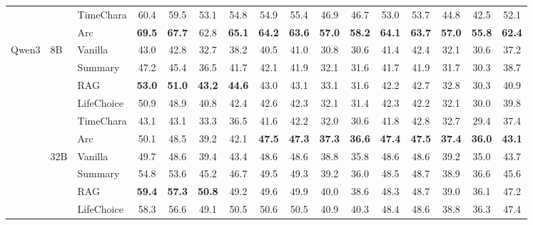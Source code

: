\documentclass[11pt]{article}
\begin{document}
\begin{table}[!htbp]
\begin{tabular}{lllccccccccccccc}
 &  & TimeChara & 60.4 & 59.5 & 53.1 & 54.8 & 54.9 & 55.4 & 46.9 & 46.7 & 53.0 & 53.7 & 44.8 & 42.5 & 52.1 \\
 &  & \cellcolor{yellow!15} Arc & \cellcolor{yellow!15} \textbf{69.5} & \cellcolor{yellow!15} \textbf{67.7} & \cellcolor{yellow!15} 62.8 & \cellcolor{yellow!15} \textbf{65.1} & \cellcolor{yellow!15} \textbf{64.2} & \cellcolor{yellow!15} \textbf{63.6} & \cellcolor{yellow!15} \textbf{57.0} & \cellcolor{yellow!15} \textbf{58.2} & \cellcolor{yellow!15} \textbf{64.1} & \cellcolor{yellow!15} \textbf{63.7} & \cellcolor{yellow!15} \textbf{57.0} & \cellcolor{yellow!15} \textbf{55.8} & \cellcolor{yellow!15} \textbf{62.4} \\
\midrule
\multirow[t]{12}{*}{Qwen3} & \multirow[t]{6}{*}{8B} & Vanilla & 43.0 & 42.8 & 32.7 & 38.2 & 40.5 & 41.0 & 30.8 & 30.6 & 41.4 & 42.4 & 32.1 & 30.6 & 37.2 \\
 &  & Summary & 47.2 & 45.4 & 36.5 & 41.7 & 42.1 & 41.9 & 32.1 & 31.6 & 41.7 & 41.9 & 31.7 & 30.3 & 38.7 \\
 &  & RAG & \textbf{53.0} & \textbf{51.0} & \textbf{43.2} & \textbf{44.6} & 43.0 & 43.1 & 33.1 & 31.6 & 42.2 & 42.7 & 32.8 & 30.3 & 40.9 \\
 &  & LifeChoice & 50.9 & 48.9 & 40.8 & 42.4 & 42.6 & 42.3 & 32.1 & 31.4 & 42.3 & 42.2 & 32.1 & 30.0 & 39.8 \\
 &  & TimeChara & 43.1 & 43.1 & 33.3 & 36.5 & 41.6 & 42.2 & 32.0 & 30.6 & 41.8 & 42.8 & 32.7 & 29.4 & 37.4 \\
 &  & \cellcolor{yellow!15} Arc & \cellcolor{yellow!15} 50.1 & \cellcolor{yellow!15} 48.5 & \cellcolor{yellow!15} 39.2 & \cellcolor{yellow!15} 42.1 & \cellcolor{yellow!15} \textbf{47.5} & \cellcolor{yellow!15} \textbf{47.3} & \cellcolor{yellow!15} \textbf{37.3} & \cellcolor{yellow!15} \textbf{36.6} & \cellcolor{yellow!15} \textbf{47.4} & \cellcolor{yellow!15} \textbf{47.5} & \cellcolor{yellow!15} \textbf{37.4} & \cellcolor{yellow!15} \textbf{36.0} & \cellcolor{yellow!15} \textbf{43.1} \\
\cmidrule(l){2-16}
 & \multirow[t]{6}{*}{32B} & Vanilla & 49.7 & 48.6 & 39.4 & 43.4 & 48.6 & 48.6 & 38.8 & 35.8 & 48.6 & 48.6 & 39.2 & 35.0 & 43.7 \\
 &  & Summary & 54.8 & 53.6 & 45.2 & 46.7 & 49.5 & 49.3 & 39.2 & 36.0 & 48.5 & 48.7 & 38.9 & 36.6 & 45.6 \\
 &  & RAG & \textbf{59.4} & \textbf{57.3} & \textbf{50.8} & 49.2 & 49.6 & 49.9 & 40.0 & 38.6 & 48.3 & 48.7 & 39.0 & 36.1 & 47.2 \\
 &  & LifeChoice & 58.3 & 56.6 & 49.1 & 50.5 & 50.6 & 50.5 & 40.9 & 40.3 & 48.4 & 48.6 & 38.8 & 36.3 & 47.4 \\

\end{tabular}
\end{table}
\end{document}
